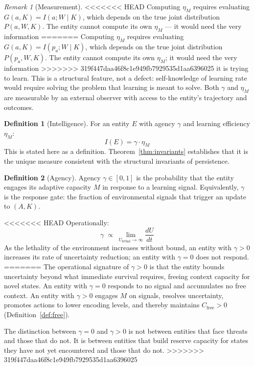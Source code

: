 \documentclass[11pt]{article}
\theoremstyle{definition}
\newtheorem{definition}{Definition}
\theoremstyle{remark}
\newtheorem{remark}{Remark}
\begin{document}
\begin{remark}[Measurement]
\label{rem:measurement}
<<<<<<< HEAD
Computing $\eta_M$ requires evaluating $G(a, K) = I(a; W \mid K)$,
which depends on the true joint distribution $P(a, W, K)$. The entity
cannot compute its own $\eta_M$ --- it would need the very information
=======
Computing $\eta_M$ requires evaluating $G(a, K) = I(p_a; W \mid K)$,
which depends on the true joint distribution $P(p_a, W, K)$. The entity
cannot compute its own $\eta_M$; it would need the very information
>>>>>>> 319f447daa46f8c1e949fb7929535d1aa6396025
it is trying to learn. This is a structural feature, not a defect:
self-knowledge of learning rate would require solving the problem that
learning is meant to solve. Both $\gamma$ and $\eta_M$ are measurable by an
external observer with access to the entity's trajectory and outcomes.
\end{remark}

\begin{definition}[Intelligence]
\label{def:intelligence}
For an entity $E$ with agency $\gamma$ and learning efficiency $\eta_M$:
\[
I(E) = \gamma \cdot \eta_M
\]
This is stated here as a definition. Theorem~\ref{thm:invariants}
establishes that it is the unique measure consistent with the structural
invariants of persistence.
\end{definition}

\begin{definition}[Agency]
\label{def:agency}
Agency $\gamma \in [0, 1]$ is the probability that the entity engages its
adaptive capacity $M$ in response to a learning signal. Equivalently,
$\gamma$ is the response gate: the fraction of environmental signals that
trigger an update to $(A, K)$.

<<<<<<< HEAD
Operationally:
\[
\gamma \;\propto\; \lim_{U_{\mathrm{lethal}} \to \infty}
\frac{dU}{dt}
\]
As the lethality of the environment increases without bound, an entity
with $\gamma > 0$ increases its rate of uncertainty reduction; an entity
with $\gamma = 0$ does not respond.
=======
The operational signature of $\gamma > 0$ is that the entity bounds
uncertainty beyond what immediate survival requires, freeing context
capacity for novel states. An entity with $\gamma = 0$ responds to no
signal and accumulates no free context. An entity with $\gamma > 0$
engages $M$ on signals, resolves uncertainty, promotes actions to lower
encoding levels, and thereby maintains $C_{\mathrm{free}} > 0$
(Definition~\ref{def:free}).

The distinction between $\gamma = 0$ and $\gamma > 0$ is not between
entities that face threats and those that do not. It is between entities
that build reserve capacity for states they have not yet encountered and
those that do not.
>>>>>>> 319f447daa46f8c1e949fb7929535d1aa6396025
\end{definition}
\end{document}
